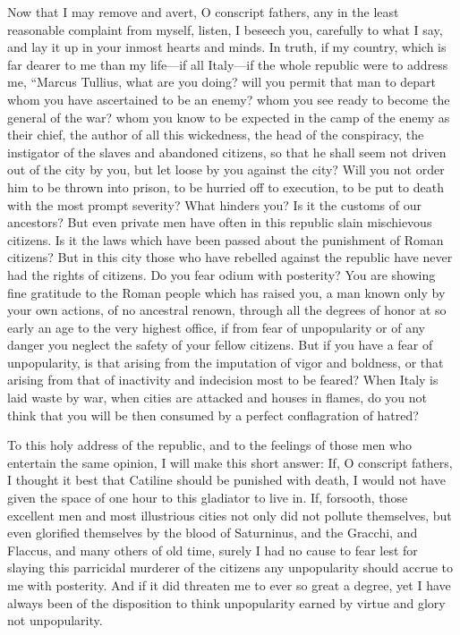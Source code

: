 \documentclass[a4paper]{amsbook}
\begin{document}
Now that I may remove and avert, O conscript fathers, any in the least reasonable complaint from myself, listen, I beseech you, carefully to what I say, and lay it up in your inmost hearts and minds. In truth, if my country, which is far dearer to me than my life—if all Italy—if the whole republic were to address me, “Marcus Tullius, what are you doing? will you permit that man to depart whom you have ascertained to be an enemy? whom you see ready to become the general of the war? whom you know to be expected in the camp of the enemy as their chief, the author of all this wickedness, the head of the conspiracy, the instigator of the slaves and abandoned citizens, so that he shall seem not driven out of the city by you, but let loose by you against the city? Will you not order him to be thrown into prison, to be hurried off to execution, to be put to death with the most prompt severity? What hinders you? Is it the customs of our ancestors? But even private men have often in this republic slain mischievous citizens. Is it the laws which have been passed about the punishment of Roman citizens? But in this city those who have rebelled against the republic have never had the rights of citizens. Do you fear odium with posterity? You are showing fine gratitude to the Roman people which has raised you, a man known only by your own actions, of no ancestral renown, through all the degrees of honor at so early an age to the very highest office, if from fear of unpopularity or of any danger you neglect the safety of your fellow citizens. But if you have a fear of unpopularity, is that arising from the imputation of vigor and boldness, or that arising from that of inactivity and indecision most to be feared? When Italy is laid waste by war, when cities are attacked and houses in flames, do you not think that you will be then consumed by a perfect conflagration of hatred?

To this holy address of the republic, and to the feelings of those men who entertain the same opinion, I will make this short answer: If, O conscript fathers, I thought it best that Catiline should be punished with death, I would not have given the space of one hour to this gladiator to live in. If, forsooth, those excellent men and most illustrious cities not only did not pollute themselves, but even glorified themselves by the blood of Saturninus, and the Gracchi, and Flaccus, and many others of old time, surely I had no cause to fear lest for slaying this parricidal murderer of the citizens any unpopularity should accrue to me with posterity. And if it did threaten me to ever so great a degree, yet I have always been of the disposition to think unpopularity earned by virtue and glory not unpopularity.
\end{document}
